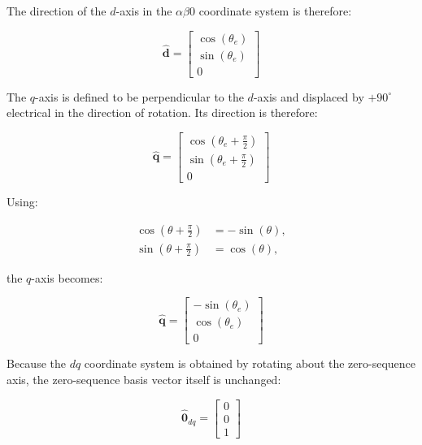 \documentclass{article}
\begin{document}
The direction of the $d$-axis in the $\alpha\beta0$ coordinate system is therefore:

\begin{equation}
    \hat{\mathbf{d}}
    =
    \begin{bmatrix}
        \cos(\theta_{e}) \\
        \sin(\theta_{e}) \\
        0
    \end{bmatrix}
\end{equation}

The $q$-axis is defined to be perpendicular to the $d$-axis and displaced by $+90^\circ$ electrical in the direction of rotation. Its direction is therefore:

\begin{equation}
    \hat{\mathbf{q}}
    =
    \begin{bmatrix}
        \cos\left(\theta_{e}+\frac{\pi}{2}\right) \\
        \sin\left(\theta_{e}+\frac{\pi}{2}\right) \\
        0
    \end{bmatrix}
\end{equation}

Using:

\begin{align}
    \cos\left(\theta+\frac{\pi}{2}\right) &= -\sin(\theta), \\
    \sin\left(\theta+\frac{\pi}{2}\right) &= \cos(\theta),
\end{align}

the $q$-axis becomes:

\begin{equation}
    \hat{\mathbf{q}}
    =
    \begin{bmatrix}
        -\sin(\theta_{e}) \\
        \cos(\theta_{e}) \\
        0
    \end{bmatrix}
\end{equation}

Because the $dq$ coordinate system is obtained by rotating about the zero-sequence axis, the zero-sequence basis vector itself is unchanged:

\begin{equation}
    \hat{\mathbf{0}}_{dq}
    =
    \begin{bmatrix}
        0 \\
        0 \\
        1
    \end{bmatrix}
\end{equation}
\end{document}
